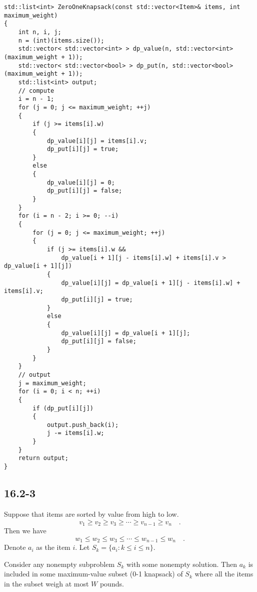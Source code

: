 \begin{verbatim}
std::list<int> ZeroOneKnapsack(const std::vector<Item>& items, int maximum_weight)
{
    int n, i, j;
    n = (int)(items.size());
    std::vector< std::vector<int> > dp_value(n, std::vector<int>(maximum_weight + 1));
    std::vector< std::vector<bool> > dp_put(n, std::vector<bool>(maximum_weight + 1));
    std::list<int> output;
    // compute
    i = n - 1;
    for (j = 0; j <= maximum_weight; ++j)
    {
        if (j >= items[i].w)
        {
            dp_value[i][j] = items[i].v;
            dp_put[i][j] = true;
        }
        else
        {
            dp_value[i][j] = 0;
            dp_put[i][j] = false;
        }
    }
    for (i = n - 2; i >= 0; --i)
    {
        for (j = 0; j <= maximum_weight; ++j)
        {
            if (j >= items[i].w && 
                dp_value[i + 1][j - items[i].w] + items[i].v > dp_value[i + 1][j])
            {
                dp_value[i][j] = dp_value[i + 1][j - items[i].w] + items[i].v;
                dp_put[i][j] = true;
            }
            else
            {
                dp_value[i][j] = dp_value[i + 1][j];
                dp_put[i][j] = false;
            }
        }
    }
    // output
    j = maximum_weight;
    for (i = 0; i < n; ++i)
    {
        if (dp_put[i][j])
        {
            output.push_back(i);
            j -= items[i].w;
        }
    }
    return output;
}
\end{verbatim}
    
\subsection*{16.2-3}

Suppose that items are sorted by value from high to low.
\begin{equation*}
    v_1 \geq v_2 \geq v_3 \geq \cdots \geq v_{n-1} \geq v_n
    \quad .
\end{equation*}
Then we have 
\begin{equation*}
    w_1 \leq w_2 \leq w_3 \leq \cdots \leq w_{n-1} \leq w_n
    \quad .
\end{equation*}
Denote $a_i$ as the item $i$.
Let $S_k = \{ a_i : k \leq i \leq n \}$.

\begin{claim}
    Consider any nonempty subproblem $S_k$ with some nonempty solution.
    Then $a_k$ is included in some maximum-value subset (0-1 knapsack) of $S_k$
    where all the items in the subset weigh at most $W$ pounds.
\end{claim}

